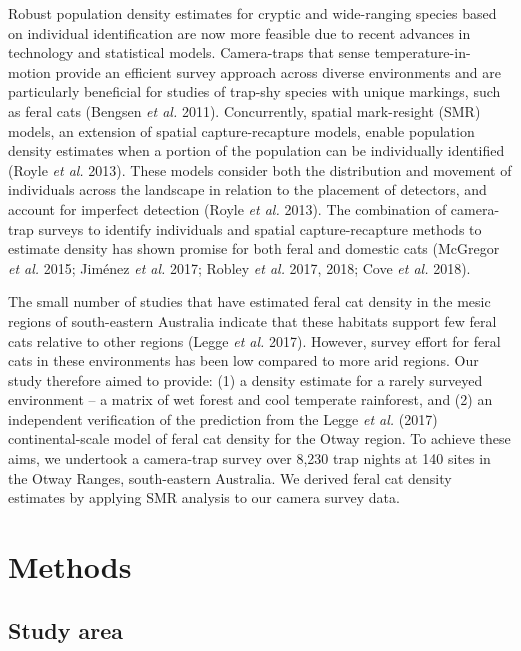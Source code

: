 \documentclass[11pt,a4paper,titlepage,twoside,openright]{style/unimelbthesis}
\begin{document}
\begin{mainmatter}
Robust population density estimates for cryptic and wide-ranging species based on individual identification are now more feasible due to recent advances in technology and statistical models. Camera-traps that sense temperature-in-motion provide an efficient survey approach across diverse environments and are particularly beneficial for studies of trap-shy species with unique markings, such as feral cats (Bengsen \emph{et al.} 2011). Concurrently, spatial mark-resight (SMR) models, an extension of spatial capture-recapture models, enable population density estimates when a portion of the population can be individually identified (Royle \emph{et al.} 2013). These models consider both the distribution and movement of individuals across the landscape in relation to the placement of detectors, and account for imperfect detection (Royle \emph{et al.} 2013). The combination of camera-trap surveys to identify individuals and spatial capture-recapture methods to estimate density has shown promise for both feral and domestic cats (McGregor \emph{et al.} 2015; Jiménez \emph{et al.} 2017; Robley \emph{et al.} 2017, 2018; Cove \emph{et al.} 2018).

The small number of studies that have estimated feral cat density in the mesic regions of south-eastern Australia indicate that these habitats support few feral cats relative to other regions (Legge \emph{et al.} 2017). However, survey effort for feral cats in these environments has been low compared to more arid regions. Our study therefore aimed to provide: (1) a density estimate for a rarely surveyed environment -- a matrix of wet forest and cool temperate rainforest, and (2) an independent verification of the prediction from the Legge \emph{et al.} (2017) continental-scale model of feral cat density for the Otway region. To achieve these aims, we undertook a camera-trap survey over 8,230 trap nights at 140 sites in the Otway Ranges, south-eastern Australia. We derived feral cat density estimates by applying SMR analysis to our camera survey data.

\newpage

\hypertarget{methods}{%
\section{Methods}\label{methods}}

\hypertarget{study-area}{%
\subsection{Study area}\label{study-area}}


\end{mainmatter}
\end{document}
